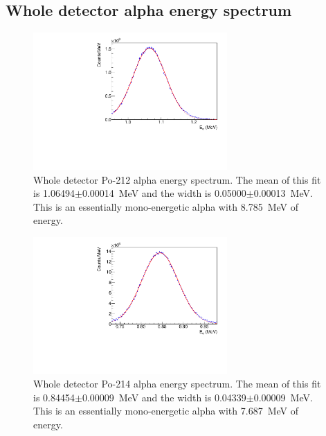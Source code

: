 \subsection{Whole detector alpha energy spectrum}
\begin{figure}[!h]
\centering
\includegraphics[width=0.66\textwidth]{figures/PubBiPo212AlphaE.pdf}
\caption{\label{fig:AlphaE212}Whole detector Po-212 alpha energy spectrum. The mean of this fit is 1.06494$\pm$0.00014~MeV and the width is 0.05000$\pm$0.00013~MeV. This is an essentially mono-energetic alpha with 8.785~MeV of energy.}
\end{figure}
\begin{figure}[!h]
\centering
\includegraphics[width=0.66\textwidth]{figures/PubBiPo214AlphaE.pdf}
\caption{\label{fig:AlphaE214}Whole detector Po-214 alpha energy spectrum. The mean of this fit is 0.84454$\pm$0.00009~MeV and the width is 0.04339$\pm$0.00009~MeV. This is an essentially mono-energetic alpha with 7.687~MeV of energy.}
\end{figure}
\newpage
